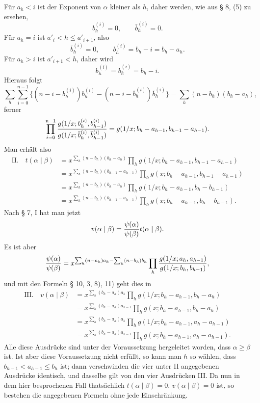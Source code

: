 Für $a_h<i$ ist der Exponent von $\alpha$ kleiner als $h$, daher werden, wie aus § 8, (5) zu ersehen,
\[
 b_h^{(i)}=0,
 \qquad \bar b_h^{(i)}=0.
\]
Für $a_h=i$ ist $a'_i<h\le a'_{i+1}$, also
\[
 \bar b_h^{(i)}=0,
 \qquad b_h^{(i)}=b_h-i=b_h-a_h.
\]
Für $a_h>i$ ist $a'_{i+1}<h$, daher wird
\[
 b_h^{(i)}=\bar b_h^{(i)}=b_h-i.
\]
Hieraus folgt
\begin{equation}
 \sum_h\sum_{i=0}^{n-1}\{(n-i-b_h^{(i)})b_h^{(i)}-(n-i-\bar b_h^{(i)})\bar b_h^{(i)}\}
 =\sum_h(n-b_h)(b_h-a_h),
\tag{4}
\end{equation}
ferner
\[
\prod_{i=0}^{n-1}
 {g(1/x;b_h^{(i)},b_{h-1}^{(i)})\over
 g(1/x;\bar b_h^{(i)},\bar b_{h-1}^{(i)})}
 =g(1/x;b_h-a_{h-1},b_{h-1}-a_{h-1}).
\]
Man erhält also
\begin{align*}
\text{II.}\quad
 t(\alpha\mid\beta)
 &=x^{\sum_h(n-b_h)(b_h-a_h)}
 \prod_h g(1/x;b_h-a_{h-1},b_{h-1}-a_{h-1})\\
 &=x^{\sum_h(n-b_h)(b_{h-1}-a_{h-1})}
 \prod_h g(x;b_h-a_{h-1},b_{h-1}-a_{h-1})\\
 &=x^{\sum_h(n-b_h)(b_h-a_h)}
 \prod_h g(1/x;b_h-a_{h-1},b_h-b_{h-1})\\
 &=x^{\sum_h(n-b_h)(b_{h-1}-a_{h-1})}
 \prod_h g(x;b_h-a_{h-1},b_h-b_{h-1}).
\end{align*}
Nach § 7, I hat man jetzt
\[
 v(\alpha\mid\beta)={\psi(\alpha)\over\psi(\beta)}t(\alpha\mid\beta).
\]
Es ist aber
\[
 {\psi(\alpha)\over\psi(\beta)}=
 x^{\sum_h(n-a_h)a_h-\sum_h(n-b_h)b_h}
 \prod_h {g(1/x;a_h,a_{h-1})\over g(1/x;b_h,b_{h-1})},
\]
und mit den Formeln § 10, 3, 8), 11) geht dies in
\begin{align*}
\text{III.}\quad
 v(\alpha\mid\beta)&=x^{\sum_h(b_h-a_h)a_h}
 \prod_h g(1/x;b_h-a_{h-1},b_h-a_h)\\
 &=x^{\sum_h(b_h-a_h)a_{h-1}}
 \prod_h g(x;b_h-a_{h-1},b_h-a_h)\\
 &=x^{\sum_h(b_h-a_h)a_h}
 \prod_h g(1/x;b_h-a_{h-1},a_h-a_{h-1})\\
 &=x^{\sum_h(b_h-a_h)a_{h-1}}
 \prod_h g(x;b_h-a_{h-1},a_h-a_{h-1}).
\end{align*}
Alle diese Ausdrücke sind unter der Voraussetzung hergeleitet worden, dass $\alpha\ge\beta$ ist. Ist aber diese Voraussetzung nicht erfüllt, so kann man $h$ so wählen, dass $b_{h-1}<a_{h-1}\le b_h$ ist; dann verschwinden die vier unter II angegebenen Ausdrücke identisch, und dasselbe gilt von den vier Ausdrücken III. Da nun in dem hier besprochenen Fall thatsächlich $t(\alpha\mid\beta)=0$, $v(\alpha\mid\beta)=0$ ist, so bestehen die angegebenen Formeln ohne jede Einschränkung.

